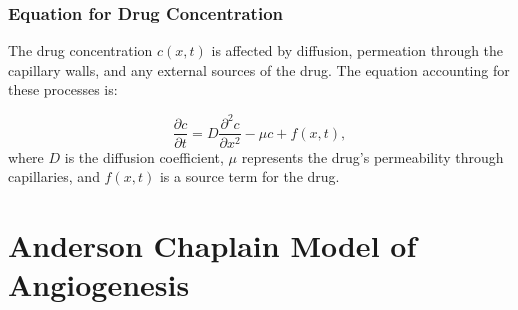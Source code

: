 \subsubsection{Equation for Drug Concentration}
The drug concentration \(c(x,t)\) is affected by diffusion, permeation through the capillary walls, and any external sources of the drug. The equation accounting for these processes is:

\begin{equation}
	\frac{\partial c}{\partial t} = D\frac{\partial^2 c}{\partial x^2} - \mu c + f(x,t),
\end{equation}
where \(D\) is the diffusion coefficient, \(\mu\) represents the drug's permeability through capillaries, and \(f(x,t)\) is a source term for the drug.




\section{Anderson Chaplain Model of Angiogenesis}

